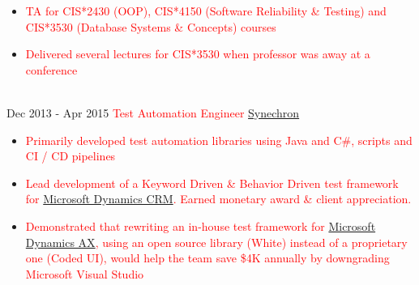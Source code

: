 \documentclass[letterpaper]{twentysecondcv} %
\begin{document}
\begin{twenty}
        {}
        {
        {\begin{itemize}
        \item \textcolor{red}{TA for CIS*2430 (OOP), CIS*4150 (Software Reliability \& Testing) and CIS*3530 (Database Systems \& Concepts) courses}
        \item \textcolor{red}{Delivered several lectures for CIS*3530 when professor was away at a conference}
    \end{itemize}}
        }
     \\
     \twentyitem
   		{Dec 2013 -}
		{Apr 2015}
        {\textcolor{red}{Test Automation Engineer}}
        {\href{http://www.synechron.com/}{Synechron}}
        {}
        {
        \begin{itemize}
        \item \textcolor{red}{Primarily developed test automation libraries using Java and C\#, scripts and CI / CD pipelines}
        \item \textcolor{red}{Lead development of a Keyword Driven \& Behavior Driven test framework for \href{https://www.microsoft.com/en-ca/dynamics/crm.aspx}{Microsoft Dynamics CRM}. Earned monetary award \& client appreciation.}
        \item \textcolor{red}{Demonstrated that rewriting an in-house test framework for \href{https://www.microsoft.com/en-ca/dynamics/erp-ax-overview.aspx}{Microsoft Dynamics AX}, using an open source library (White) instead of a proprietary one (Coded UI), would help the team save \$4K annually by downgrading Microsoft Visual Studio}
    \end{itemize}
    	}
        
\end{twenty}

\end{document}
